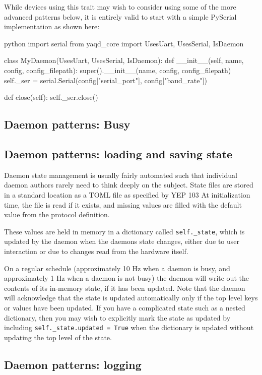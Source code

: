 While devices using this trait may wish to consider using some of the more advanced patterns below, it is entirely valid to start with a simple PySerial\cite{} implementation as shown here:

\begin{codefragment}{python}
import serial
from yaqd_core import UsesUart, UsesSerial, IsDaemon

class MyDaemon(UsesUart, UsesSerial, IsDaemon):
    def __init__(self, name, config, config_filepath):
	super().__init__(name, config, config_filepath)
	self._ser = serial.Serial(config["serial_port"], config["baud_rate"])

    def close(self):
	self._ser.close()
\end{codefragment}

\subsection{Daemon patterns: Busy}

\subsection{Daemon patterns: loading and saving state}

Daemon state management is usually fairly automated such that individual daemon authors rarely need to think deeply on the subject.
State files are stored in a standard location as a TOML file as specified by YEP 103\cite{}
At initialization time, the file is read if it exists, and missing values are filled with the default value from the protocol definition.

These values are held in memory in a dictionary called \texttt{self.\_state}, which is updated by the daemon when the daemons state changes, either due to user interaction or due to changes read from the hardware itself.

On a regular schedule (approximately 10 Hz when a daemon is busy, and approximately 1 Hz when a daemon is not busy) the daemon will write out the contents of its in-memory state, if it has been updated.
Note that the daemon will acknowledge that the state is updated automatically only if the top level keys or values have been updated.
If you have a complicated state such as a nested dictionary, then you may wish to explicitly mark the state as updated by including \texttt{self.\_state.updated = True} when the dictionary is updated without updating the top level of the state.

\subsection{Daemon patterns: logging}

